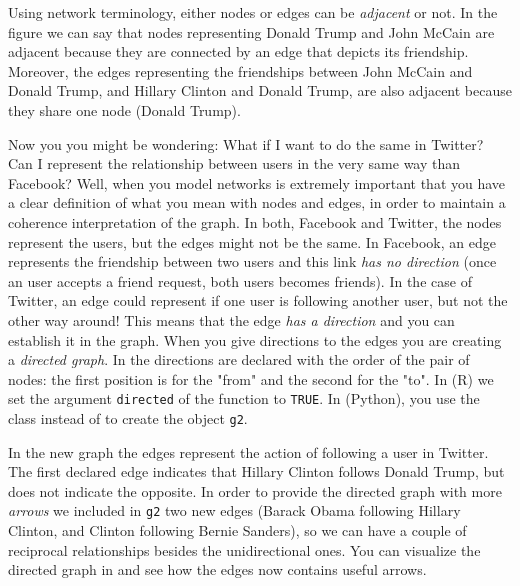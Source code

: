 
Using network terminology, either nodes or edges can be \textit{adjacent} or not. In the figure we can say that nodes representing Donald Trump and John McCain are adjacent because they are connected by an edge that depicts its friendship. Moreover, the edges representing the friendships between John McCain and Donald Trump, and Hillary Clinton and Donald Trump, are also adjacent because they share one node (Donald Trump).

Now you you might be wondering: What if I want to do the same in Twitter? Can I represent the relationship between users in the very same way than Facebook? Well, when you model networks is extremely important that you have a clear definition of what you mean with nodes and edges, in order to maintain a coherence interpretation of the graph. In both, Facebook and Twitter, the nodes represent the users, but the edges might not be the same. In Facebook, an edge represents the friendship between two users and this link \textit{has no direction} (once an user accepts a friend request, both users becomes friends). In the case of Twitter, an edge could represent if one user is following another user, but not the other way around! This means that the edge \textit{has a direction} and you can establish it in the graph. When you give directions to the edges you are creating a \textit{directed graph}. In  the directions are declared with the order of the pair of nodes: the first position is for the "from" and the second for the "to". In  (R) we  set the argument \verb+directed+ of the function  to \verb+TRUE+. In  (Python), you use the class  instead of  to create the object \texttt{g2}.


In the new graph the edges represent the action of following a user in Twitter. The first declared edge indicates that Hillary Clinton follows Donald Trump, but does not indicate the opposite. In order to provide the directed graph with more \textit{arrows} we included in \texttt{g2} two new edges (Barack Obama following Hillary Clinton, and Clinton following Bernie Sanders), so we can have a couple of reciprocal relationships besides the unidirectional ones. You can visualize the directed graph in  and see how the edges now contains useful arrows.

